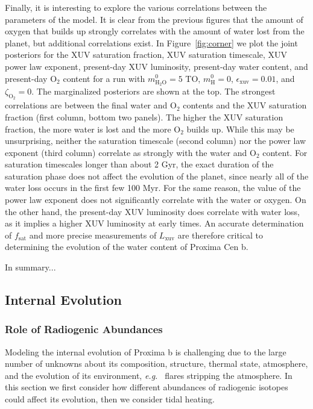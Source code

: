 \documentclass[preprint,12pt]{aastex}
\newcommand{\xxx}[1]{{\color{red} #1}} %
\def\eg{{\it e.g.\ }}
\begin{document}
Finally, it is interesting to explore the various correlations between the parameters of the model. It is
clear from the previous figures that the amount of oxygen that builds up strongly correlates with the
amount of water lost from the planet, but additional correlations exist. In Figure~\ref{fig:corner} we plot
the joint posteriors for the XUV saturation fraction, XUV saturation timescale, XUV power law exponent,
present-day XUV luminosity, present-day water content, and present-day O$_2$ content for a run with
$m_\mathrm{H_2O}^0 = 5$ TO, $m_\mathrm{H}^0 = 0$, $\epsilon_\mathrm{xuv} = 0.01$, and $\zeta_\mathrm{O_2} = 0$.
The marginalized posteriors are shown at the top. The strongest correlations are between the final
water and O$_2$ contents and the XUV saturation fraction (first column, bottom two panels). The higher
the XUV saturation fraction, the more water is lost and the more O$_2$ builds up. While this
may be unsurprising, neither the saturation timescale (second column) nor the power law exponent 
(third column) correlate as strongly
with the water and O$_2$ content. For saturation timescales longer than about 2 Gyr, the exact duration
of the saturation phase does not affect the evolution of the planet, since nearly all of the water loss
occurs in the first few 100 Myr. For the same reason, the value of the power law exponent does not
significantly correlate with the water or oxygen. On the other hand, the present-day XUV luminosity does correlate
with water loss, as it implies a higher XUV luminosity at early times.
An accurate determination of $f_\mathrm{sat}$ and more precise measurements of $L_\mathrm{xuv}$ are therefore
critical to determining the evolution of the water content of Proxima Cen b.

\xxx{In summary...}

\subsection{Internal Evolution}
\label{sec:results:internal}

\subsubsection{Role of Radiogenic Abundances}

Modeling the internal evolution of Proxima b is challenging due to
 the large number of unknowns about its composition, 
structure, thermal state,
 atmosphere, and the evolution of its environment, \eg
flares stripping the atmosphere. In this section we first consider how
different abundances of radiogenic isotopes could affect its
evolution, then we consider tidal heating.
\end{document}
